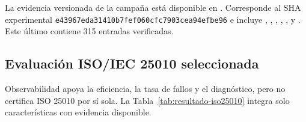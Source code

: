 La evidencia versionada de la campaña está disponible en
. Corresponde al SHA
experimental \texttt{e43967eda31410b7fef060cfc7903cea94efbe96} e incluye
, ,
, ,
,  y . Este último contiene
315 entradas verificadas.

\subsection{Evaluación ISO/IEC 25010 seleccionada}
\label{subsec:tabla-iso25010}

Observabilidad apoya la eficiencia, la tasa de fallos y el diagnóstico, pero no
certifica ISO 25010 por sí sola. La Tabla~\ref{tab:resultado-iso25010} integra
solo características con evidencia disponible.


